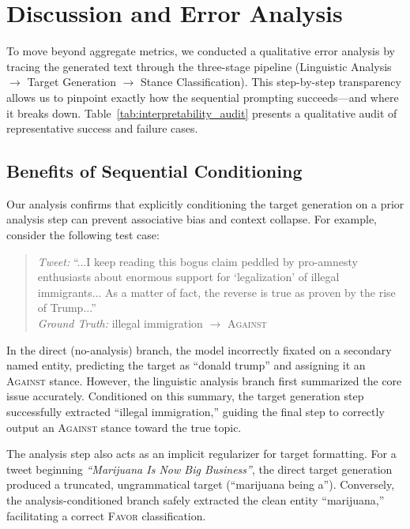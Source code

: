 \documentclass[conference]{IEEEtran}
\begin{document}
\section{Discussion and Error Analysis}

To move beyond aggregate metrics, we conducted a qualitative error analysis by tracing the generated text through the three-stage pipeline (Linguistic Analysis $\rightarrow$ Target Generation $\rightarrow$ Stance Classification). This step-by-step transparency allows us to pinpoint exactly how the sequential prompting succeeds—and where it breaks down. Table~\ref{tab:interpretability_audit} presents a qualitative audit of representative success and failure cases.

\subsection{Benefits of Sequential Conditioning}

Our analysis confirms that explicitly conditioning the target generation on a prior analysis step can prevent associative bias and context collapse. For example, consider the following test case:

\begin{quote}
\textit{Tweet:} ``...I keep reading this bogus claim peddled by pro-amnesty enthusiasts about enormous support for `legalization' of illegal immigrants... As a matter of fact, the reverse is true as proven by the rise of Trump...''\\
\textit{Ground Truth:} illegal immigration $\rightarrow$ \textsc{Against}
\end{quote}

In the direct (no-analysis) branch, the model incorrectly fixated on a secondary named entity, predicting the target as ``donald trump'' and assigning it an \textsc{Against} stance. However, the linguistic analysis branch first summarized the core issue accurately. Conditioned on this summary, the target generation step successfully extracted ``illegal immigration,'' guiding the final step to correctly output an \textsc{Against} stance toward the true topic. 

The analysis step also acts as an implicit regularizer for target formatting. For a tweet beginning \textit{``Marijuana Is Now Big Business''}, the direct target generation produced a truncated, ungrammatical target (``marijuana being a''). Conversely, the analysis-conditioned branch safely extracted the clean entity ``marijuana,'' facilitating a correct \textsc{Favor} classification.
\end{document}
